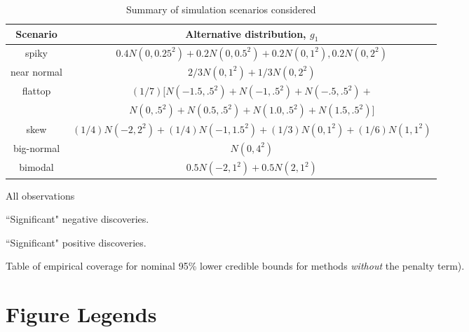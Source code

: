 \documentclass[11pt]{article}
\begin{document}
\begin{table}[!ht]
\centering\begin{tabular}{c c } \toprule
Scenario & Alternative distribution, $g_1$  \\ \midrule
spiky & $0.4 N(0,0.25^2) + 0.2 N(0,0.5^2) + 0.2 N(0,1^2), 0.2 N(0,2^2) $\\
near normal & $2/3 N(0,1^2) + 1/3 N(0,2^2)$ \\
flattop& $(1/7) [N(-1.5,.5^2) + N(-1,.5^2) + N(-.5,.5^2) +$ \\
 &  $N(0,.5^2) +N(0.5,.5^2)  +N(1.0,.5^2) + N(1.5,.5^2)]$  \\
skew & $(1/4) N(-2,2^2) + (1/4) N(-1,1.5^2) +  (1/3) N(0,1^2) + (1/6) N(1,1^2) $\\
big-normal & $N(0,4^2)$ \\ 
bimodal & $0.5 N(-2,1^2) + 0.5 N(2,1^2)$ \\ \bottomrule
\end{tabular}
\caption{Summary of simulation scenarios considered} \label{table:scenarios}
\end{table}


\begin{table}[!ht]
\begin{subtable}{\textwidth}
	\centering
	\caption{All observations}
\end{subtable}

\begin{subtable}{\textwidth}
\centering
\caption{``Significant" negative discoveries.}
\end{subtable}

\begin{subtable}{\textwidth}
\centering
\caption{``Significant" positive discoveries.}
\end{subtable}

\caption{Table of empirical coverage for nominal 95\% lower credible bounds for methods {\it without} the penalty term). } \label{tab:nopen}
\end{table}
\section*{Figure Legends}
\end{document}
